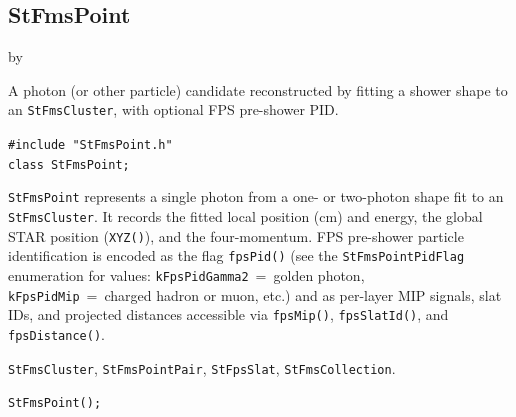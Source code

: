 \documentclass[twoside]{article}
\newcommand{\entrylabel}[1]{\mbox{\textbf{{#1}}}\hfil}%
\newenvironment{entry}
{\begin{list}{}%
    {\renewcommand{\makelabel}{\entrylabel}%
     \setlength{\labelwidth}{90pt}%
     \setlength{\leftmargin}{\labelwidth}
     \advance\leftmargin by \labelsep%
      }%
    }%
  {\end{list}}
\newcommand{\Entrylabel}[1]%
{\raisebox{0pt}[1ex][0pt]{\makebox[\labelwidth][l]%
    {\parbox[t]{\labelwidth}{\hspace{0pt}\textbf{{#1}}}}}}
\newenvironment{Entry}%
{\renewcommand{\entrylabel}{\Entrylabel}\begin{entry}}%
  {\end{entry}}
\begin{document}
\subsection{StFmsPoint}
\label{sec:StFmsPoint}
\begin{Entry}
\item[Summary]
    A photon (or other particle) candidate reconstructed by fitting a shower
    shape to an \texttt{StFmsCluster}, with optional FPS pre-shower PID.

\item[Synopsis]
    \verb+#include "StFmsPoint.h"+\\
    \verb+class StFmsPoint;+\\

\item[Description]
    \texttt{StFmsPoint} represents a single photon from a one- or two-photon
    shape fit to an \texttt{StFmsCluster}.  It records the fitted local
    position (cm) and energy, the global STAR position (\texttt{XYZ()}),
    and the four-momentum.  FPS pre-shower particle identification is encoded
    as the flag \texttt{fpsPid()} (see the \texttt{StFmsPointPidFlag}
    enumeration for values: \texttt{kFpsPidGamma2}~=~golden photon,
    \texttt{kFpsPidMip}~=~charged hadron or muon, etc.) and as per-layer MIP
    signals, slat IDs, and projected distances accessible via
    \texttt{fpsMip()}, \texttt{fpsSlatId()}, and \texttt{fpsDistance()}.

\item[Related Classes]
    \texttt{StFmsCluster}, \texttt{StFmsPointPair}, \texttt{StFpsSlat},
    \texttt{StFmsCollection}.

\item[Public\\ Constructors]
    \verb+StFmsPoint();+\\


\end{Entry}
\end{document}
